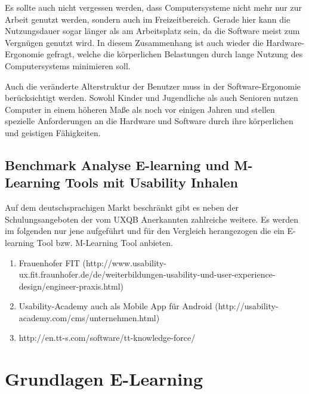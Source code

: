 \documentclass[a4paper, 12pt, twoside, BCOR=20mm, DIV=calc, abstracton, parskip=half*, toc=bibliography, toc=listof, headsepline, footsepline, headings=small, numbers=enddot]{scrreprt}
\begin{document}
		Es sollte auch nicht vergessen werden, dass Computersysteme nicht mehr nur zur Arbeit genutzt werden, sondern auch im Freizeitbereich. Gerade hier kann die Nutzungsdauer sogar länger als am Arbeitsplatz sein, da die Software meist zum Vergnügen genutzt wird. In diesem Zusammenhang ist auch wieder die Hardware-Ergonomie gefragt, welche die körperlichen Belastungen durch lange Nutzung des Computersystems minimieren soll.
		
		Auch die veränderte Alterstruktur der Benutzer muss in der Software-Ergonomie berücksichtigt werden. Sowohl Kinder und Jugendliche als auch Senioren nutzen Computer in einem höheren Maße als noch vor einigen Jahren und stellen spezielle Anforderungen an die Hardware und Software durch ihre körperlichen und geistigen Fähigkeiten.
		
			
	
	
	
	
	\section{Benchmark Analyse E-learning und M-Learning Tools mit Usability Inhalen}
	Auf dem deutschsprachigen Markt beschränkt gibt es neben der Schulungsangeboten der vom \ac{UXQB} Anerkannten zahlreiche weitere. Es werden im folgenden nur jene aufgeführt und für den Vergleich herangezogen die ein E-learning Tool bzw. M-Learning Tool anbieten. 
	\begin{enumerate}
		\item Frauenhofer FIT (http://www.usability-ux.fit.fraunhofer.de/de/weiterbildungen-usability-und-user-experience-design/engineer-praxis.html)
		\item Usability-Academy  auch als Mobile App für Android (http://usability-academy.com/cms/unternehmen.html)
		\item http://en.tt-s.com/software/tt-knowledge-force/
	\end{enumerate}
		
	\chapter{Grundlagen E-Learning}
\end{document}
